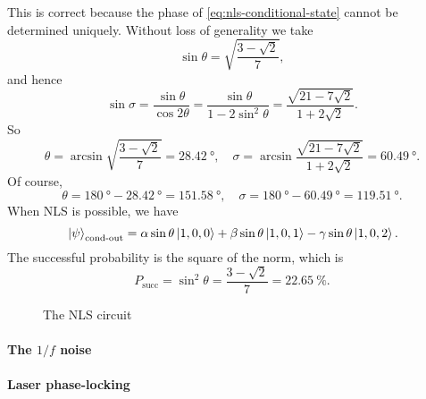 \documentclass[hyperref, a4paper]{article}
\begin{document}
\begin{itemize}
    This is correct because the phase of \eqref{eq:nls-conditional-state} cannot be determined uniquely.
    Without loss of generality we take 
    \[
        \sin \theta = \sqrt{\frac{3 - \sqrt{2}}{7}},
    \]
    and hence 
    \[
        \sin \sigma = \frac{\sin \theta}{\cos 2 \theta} = \frac{\sin \theta}{1 - 2 \sin^2 \theta} = \frac{\sqrt{21 - 7 \sqrt{2}}}{1 + 2 \sqrt{2}}.
    \]
    So 
    \begin{equation}
        \theta = \arcsin \sqrt{\frac{3 - \sqrt{2}}{7}} = \SI{28.42}{\degree}, \quad \sigma = \arcsin \frac{\sqrt{21 - 7 \sqrt{2}}}{1 + 2 \sqrt{2}} = \SI{60.49}{\degree}.
    \end{equation}
    Of course, 
    \begin{equation}
        \theta = \SI{180}{\degree} - \SI{28.42}{\degree} = \SI{151.58}{\degree}, \quad \sigma = \SI{180}{\degree} - \SI{60.49}{\degree} = \SI{119.51}{\degree}.
    \end{equation}
    When NLS is possible, we have 
    \[
        \ket*{\psi}_\text{cond-out} = \alpha \sin \theta \ket*{1, 0, 0} + \beta \sin \theta \ket*{1, 0, 1} - \gamma \sin \theta \ket*{1, 0, 2}.
    \]
    The successful probability is the square of the norm, which is 
    \begin{equation}
        P_\text{succ} = \sin^2 \theta = \frac{3 - \sqrt{2}}{7} = \SI{22.65}{\percent}.
    \end{equation}
\end{itemize}

\begin{figure}
    \centering
    
    \caption{The NLS circuit}
    \label{fig:nls}
\end{figure}

\paragraph{}

\paragraph{The $1/f$ noise} 

\paragraph{Laser phase-locking} 
\end{document}
